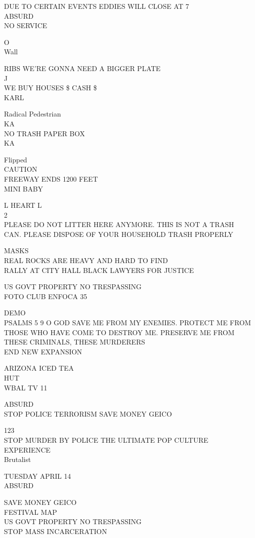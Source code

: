 \documentclass[10pt,letterpaper]{article}
\begin{document}
DUE TO CERTAIN EVENTS EDDIES WILL CLOSE AT 7\\
ABSURD\\
NO SERVICE

O\\
Wall

RIBS WE'RE GONNA NEED A BIGGER PLATE\\
J\\
WE BUY HOUSES \$ CASH \$\\
KARL

Radical Pedestrian\\
KA\\
NO TRASH PAPER BOX\\
KA

Flipped\\
CAUTION\\
FREEWAY ENDS 1200 FEET\\
MINI BABY

L HEART L\\
2\\
PLEASE DO NOT LITTER HERE ANYMORE.  THIS IS NOT A TRASH CAN.  PLEASE DISPOSE OF YOUR HOUSEHOLD TRASH PROPERLY

MASKS\\
REAL ROCKS ARE HEAVY AND HARD TO FIND\\
RALLY AT CITY HALL BLACK LAWYERS FOR JUSTICE

US GOVT PROPERTY NO TRESPASSING\\
FOTO CLUB ENFOCA 35

DEMO\\
PSALMS 5 9 O GOD SAVE ME FROM MY ENEMIES.  PROTECT ME FROM THOSE WHO HAVE COME TO DESTROY ME.  PRESERVE ME FROM THESE CRIMINALS, THESE MURDERERS\\
END NEW EXPANSION

ARIZONA ICED TEA\\
HUT\\
WBAL TV 11

ABSURD\\
STOP POLICE TERRORISM SAVE MONEY GEICO

123\\
STOP MURDER BY POLICE THE ULTIMATE POP CULTURE EXPERIENCE\\
Brutalist

TUESDAY APRIL 14\\
ABSURD

SAVE MONEY GEICO\\
FESTIVAL MAP\\
US GOVT PROPERTY NO TRESPASSING\\
STOP MASS INCARCERATION
\end{document}
